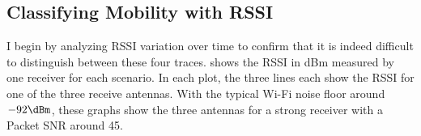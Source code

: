 \subsection{Classifying Mobility with RSSI}
I begin by analyzing RSSI variation over time to confirm that it is indeed difficult to distinguish between these four traces.  shows the RSSI in dBm measured by one receiver for each scenario. In each plot, the three lines each show the RSSI for one of the three receive antennas. With the typical Wi-Fi noise floor around $-92\dBm$, these graphs show the three antennas for a strong receiver with a Packet SNR around 45\dB.

\begin{figure}[htb]
	\centering
	\hspace{0.06\textwidth}%
	

\end{figure}
